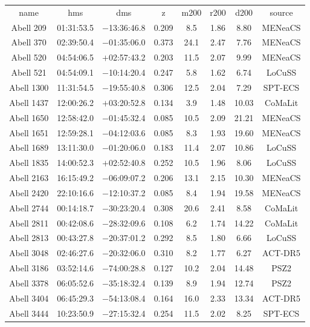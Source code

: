 \begin{table}
\begin{tabular}{cccccccc}
name & hms & dms & z & m200 & r200 & d200 & source \\
Abell 209 & 01:31:53.5 & $-$13:36:46.8 & 0.209 & 8.5 & 1.86 & 8.80 & MENeaCS \\
Abell 370 & 02:39:50.4 & $-$01:35:06.0 & 0.373 & 24.1 & 2.47 & 7.76 & MENeaCS \\
Abell 520 & 04:54:06.5 & $+$02:57:43.2 & 0.203 & 11.5 & 2.07 & 9.99 & MENeaCS \\
Abell 521 & 04:54:09.1 & $-$10:14:20.4 & 0.247 & 5.8 & 1.62 & 6.74 & LoCuSS \\
Abell 1300 & 11:31:54.5 & $-$19:55:40.8 & 0.306 & 12.5 & 2.04 & 7.29 & SPT-ECS \\
Abell 1437 & 12:00:26.2 & $+$03:20:52.8 & 0.134 & 3.9 & 1.48 & 10.03 & CoMaLit \\
Abell 1650 & 12:58:42.0 & $-$01:45:32.4 & 0.085 & 10.5 & 2.09 & 21.21 & MENeaCS \\
Abell 1651 & 12:59:28.1 & $-$04:12:03.6 & 0.085 & 8.3 & 1.93 & 19.60 & MENeaCS \\
Abell 1689 & 13:11:30.0 & $-$01:20:06.0 & 0.183 & 11.4 & 2.07 & 10.86 & LoCuSS \\
Abell 1835 & 14:00:52.3 & $+$02:52:40.8 & 0.252 & 10.5 & 1.96 & 8.06 & LoCuSS \\
Abell 2163 & 16:15:49.2 & $-$06:09:07.2 & 0.206 & 13.1 & 2.15 & 10.30 & MENeaCS \\
Abell 2420 & 22:10:16.6 & $-$12:10:37.2 & 0.085 & 8.4 & 1.94 & 19.58 & MENeaCS \\
Abell 2744 & 00:14:18.7 & $-$30:23:20.4 & 0.308 & 20.6 & 2.41 & 8.58 & CoMaLit \\
Abell 2811 & 00:42:08.6 & $-$28:32:09.6 & 0.108 & 6.2 & 1.74 & 14.22 & CoMaLit \\
Abell 2813 & 00:43:27.8 & $-$20:37:01.2 & 0.292 & 8.5 & 1.80 & 6.66 & LoCuSS \\
Abell 3048 & 02:46:27.6 & $-$20:32:06.0 & 0.310 & 8.2 & 1.77 & 6.27 & ACT-DR5 \\
Abell 3186 & 03:52:14.6 & $-$74:00:28.8 & 0.127 & 10.2 & 2.04 & 14.48 & PSZ2 \\
Abell 3378 & 06:05:52.6 & $-$35:18:32.4 & 0.139 & 8.9 & 1.94 & 12.74 & PSZ2 \\
Abell 3404 & 06:45:29.3 & $-$54:13:08.4 & 0.164 & 16.0 & 2.33 & 13.34 & ACT-DR5 \\
Abell 3444 & 10:23:50.9 & $-$27:15:32.4 & 0.254 & 11.5 & 2.02 & 8.25 & SPT-ECS \\

\end{tabular}
\end{table}
